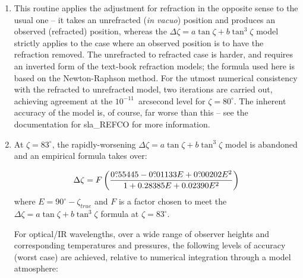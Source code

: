 \documentclass[11pt,twoside,nolof]{starlink}
\begin{document}
{
 \begin{enumerate}
  \item This routine applies the adjustment for refraction in the
        opposite sense to the usual one -- it takes an unrefracted
        (\textit{in vacuo}\/) position and produces an observed (refracted)
        position, whereas the
        $\Delta \zeta = a \tan \zeta + b \tan^{3} \zeta$
        model strictly
        applies to the case where an observed position is to have the
        refraction removed.  The unrefracted to refracted case is
        harder, and requires an inverted form of the text-book
        refraction models;  the formula used here is based on the
        Newton-Raphson method.  For the utmost numerical consistency
        with the refracted to unrefracted model, two iterations are
        carried out, achieving agreement at the $10^{-11}$~arcsecond level
        for $\zeta=80^\circ$.  The inherent accuracy of the model
        is, of course, far worse than this -- see the documentation for
        sla\_REFCO for more information.
  \item At $\zeta=83^\circ$, the rapidly-worsening
        $\Delta \zeta = a \tan \zeta + b \tan^{3} \zeta$
        model is abandoned and an empirical formula takes over:

          \[\Delta \zeta = F \left(
  \frac{0^\circ\hspace{-0.37em}.\hspace{0.02em}55445
                - 0^\circ\hspace{-0.37em}.\hspace{0.02em}01133 E
                          + 0^\circ\hspace{-0.37em}.\hspace{0.02em}00202 E^2}
             {1 + 0.28385 E +0.02390 E^2} \right) \]
        where $E=90^\circ-\zeta_{true}$
        and $F$ is a factor chosen to meet the
        $\Delta \zeta = a \tan \zeta + b \tan^{3} \zeta$
        formula at $\zeta=83^\circ$.

        For optical/IR wavelengths, over a wide range of observer heights
        and corresponding temperatures and pressures, the following levels
        of accuracy (worst case) are achieved,
        relative to numerical integration through a model atmosphere:


\end{enumerate}}
\end{document}
